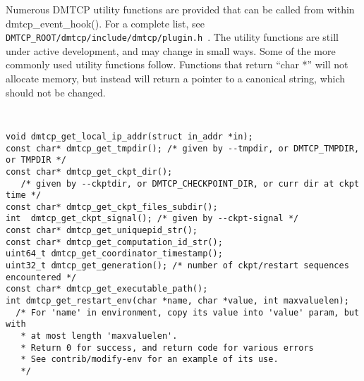 \documentclass{article}
\begin{document}
Numerous DMTCP utility functions are provided that can be called from within
dmtcp\_event\_hook().  For a complete list, see
{\tt DMTCP\_ROOT/dmtcp/include/dmtcp/plugin.h}~.
The utility functions are still under active development, and may change
in small ways.  Some of the more commonly used utility functions follow.
Functions that return ``char *'' will not allocate memory, but instead will
return a pointer to a canonical string, which should not be changed.
{\tt
\begin{verbatim}
void dmtcp_get_local_ip_addr(struct in_addr *in);
const char* dmtcp_get_tmpdir(); /* given by --tmpdir, or DMTCP_TMPDIR, or TMPDIR */
const char* dmtcp_get_ckpt_dir();
   /* given by --ckptdir, or DMTCP_CHECKPOINT_DIR, or curr dir at ckpt time */
const char* dmtcp_get_ckpt_files_subdir();
int  dmtcp_get_ckpt_signal(); /* given by --ckpt-signal */
const char* dmtcp_get_uniquepid_str();
const char* dmtcp_get_computation_id_str();
uint64_t dmtcp_get_coordinator_timestamp();
uint32_t dmtcp_get_generation(); /* number of ckpt/restart sequences encountered */
const char* dmtcp_get_executable_path();
int dmtcp_get_restart_env(char *name, char *value, int maxvaluelen);
  /* For 'name' in environment, copy its value into 'value' param, but with
   * at most length 'maxvaluelen'.
   * Return 0 for success, and return code for various errors
   * See contrib/modify-env for an example of its use.
   */
\end{verbatim}
}
\end{document}
